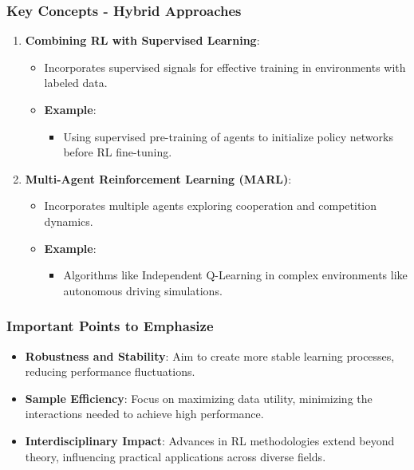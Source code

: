 \documentclass{beamer}
\begin{document}
\begin{frame}[fragile]
    \frametitle{Key Concepts - Hybrid Approaches}
    \begin{enumerate}
        \item \textbf{Combining RL with Supervised Learning}:
        \begin{itemize}
            \item Incorporates supervised signals for effective training in environments with labeled data.
            \item \textbf{Example}: 
                \begin{itemize}
                    \item Using supervised pre-training of agents to initialize policy networks before RL fine-tuning.
                \end{itemize}
        \end{itemize}

        \item \textbf{Multi-Agent Reinforcement Learning (MARL)}:
        \begin{itemize}
            \item Incorporates multiple agents exploring cooperation and competition dynamics.
            \item \textbf{Example}: 
                \begin{itemize}
                    \item Algorithms like Independent Q-Learning in complex environments like autonomous driving simulations.
                \end{itemize}
        \end{itemize}
    \end{enumerate}
\end{frame}

\begin{frame}[fragile]
    \frametitle{Important Points to Emphasize}
    \begin{itemize}
        \item \textbf{Robustness and Stability}: Aim to create more stable learning processes, reducing performance fluctuations.
        \item \textbf{Sample Efficiency}: Focus on maximizing data utility, minimizing the interactions needed to achieve high performance.
        \item \textbf{Interdisciplinary Impact}: Advances in RL methodologies extend beyond theory, influencing practical applications across diverse fields.
    \end{itemize}
\end{frame}
\end{document}
